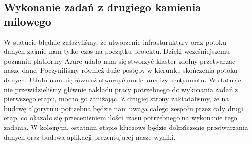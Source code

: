 \documentclass[a4paper,11pt, notitlepage ]{article}
\begin{document}
\subsection{Wykonanie zadań z drugiego kamienia milowego}
W statucie błędnie założyliśmy, że utworzenie infrasturuktury oraz potoku danych zajmie nam tylko czas na początku projektu. Dzięki wcześniejszemu poznaniu platformy Azure udało nam się stworzyć klaster zdolny przetwarzać nasze dane. Poczyniliśmy również duże postępy w kierunku skończenia potoku danych. Udało nam się również stworzyć model analizy sentymentu. W statucie nie przewidzieliśmy głównie nakładu pracy potrzebnego do wykonania zadań z pierwszego etapu, mocno go zaniżając. Z drugiej strony zakładaliśmy, że na budowę algorytmu potrzebna będzie nam uwaga całego zespołu przez cały drugi etap, co okazało się przecenieniem ilości czasu potrzebnego na wykonanie tego zadania. W kolejnym, ostatnim etapie kluczowe będzie dokończenie przetwarzania danych oraz budowa aplikacji prezentującej nasze wyniki.

\end{document}
